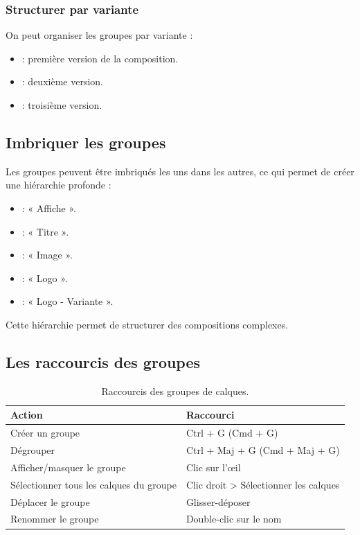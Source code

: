 \subsubsection{Structurer par variante}

On peut organiser les groupes par variante :

\begin{itemize}
    \item {} : première version de la composition.
    \item {} : deuxième version.
    \item {} : troisième version.
\end{itemize}

\subsection{Imbriquer les groupes}

Les groupes peuvent être imbriqués les uns dans les autres, ce qui permet de créer une hiérarchie profonde :

\begin{itemize}
    \item {} : « Affiche ».
    \item {} : « Titre ».
    \item {} : « Image ».
    \item {} : « Logo ».
    \item {} : « Logo - Variante ».
\end{itemize}

Cette hiérarchie permet de structurer des compositions complexes.

\subsection{Les raccourcis des groupes}

\begin{table}[h!]
\centering
\begin{tabular}{@{}ll@{}}
\toprule
\textbf{Action} & \textbf{Raccourci} \\
\midrule
Créer un groupe & Ctrl + G (Cmd + G) \\
Dégrouper & Ctrl + Maj + G (Cmd + Maj + G) \\
Afficher/masquer le groupe & Clic sur l'œil \\
Sélectionner tous les calques du groupe & Clic droit > Sélectionner les calques \\
Déplacer le groupe & Glisser-déposer \\
Renommer le groupe & Double-clic sur le nom \\
\bottomrule
\end{tabular}
\caption{Raccourcis des groupes de calques.}
\end{table}

